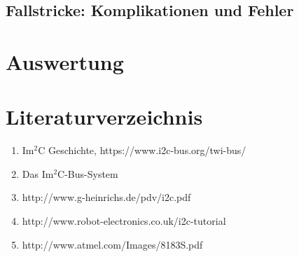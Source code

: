 \documentclass[12pt, a4paper]{scrartcl}
\begin{document}
\subsection{Fallstricke: Komplikationen und Fehler}


\section{Auswertung}


\section{Literaturverzeichnis}

\begin{enumerate}
	\item Im$^2$C Geschichte,  https://www.i2c-bus.org/twi-bus/
	\item Das Im$^2$C-Bus-System
	\item http://www.g-heinrichs.de/pdv/i2c.pdf
	\item http://www.robot-electronics.co.uk/i2c-tutorial
	\item http://www.atmel.com/Images/8183S.pdf
\end{enumerate}
\end{document}
